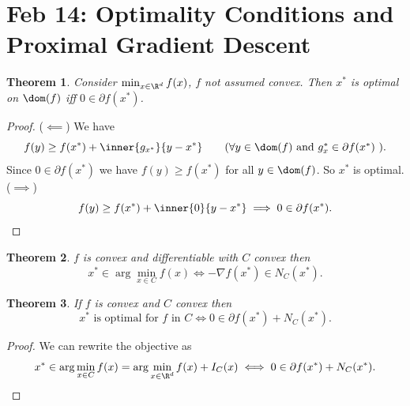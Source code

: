 \documentclass[a4paper]{article}
\newtheorem{thm}{Theorem}[section]
\begin{document}
\section{Feb 14: Optimality Conditions and Proximal Gradient Descent}
\begin{thm}
    Consider $\min_{x \in \R^d} f(x)$, $f$ not assumed convex. Then $x^*$ is optimal on $\dom(f)$ iff $0 \in \partial f(x^*)$.
\end{thm}
\begin{proof}
($\impliedby$) We have \[
f(y)\geq f(x^*)+\inner{g_{x^*}}{y-x^*}\tag{$\forall y\in \dom(f)$ and $g_x^*\in \partial f(x^*)$ }
.\] 
Since $0\in \partial f(x^*)$ we have $f(y)\geq f(x^*)$ for all $y\in \dom(f)$. So $x^*$ is optimal.\\
($\implies$) \[
f(y)\geq f(x^*)+\inner{0}{y-x^*}\implies 0\in \partial f(x^*)
.\] 
\end{proof}
\begin{thm}
    $f$ is convex and differentiable with $C$ convex then \[
    x^*\in \arg\min_{x\in C}f(x) \iff -\nabla f(x^*)\in N_C(x^*)
    .\] 
\end{thm}
\begin{thm}
    If $f$ is convex and $C$ convex then \[
    x^* \text{ is optimal for $f$ in $C$} \iff 0\in \partial f(x^*)+N_C(x^*)
    .\] 
\end{thm}
\begin{proof}
    We can rewrite the objective as \[
    x^*\in \arg\min_{x\in C}f(x)=\arg\min_{x\in \R^d}f(x)+I_C(x) \iff 0\in \partial f(x^*)+N_C(x^*)
    .\] 
\end{proof}
\end{document}
